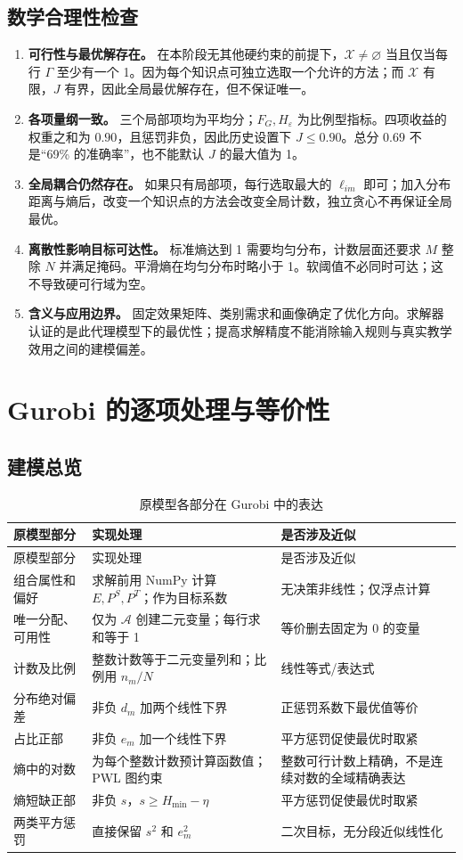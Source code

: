 \documentclass[UTF8,11pt,a4paper,fontset=fandol]{ctexart}
\newcommand{\A}{\mathcal A}
\newcommand{\X}{\mathcal X}
\begin{document}
\subsection{数学合理性检查}
\begin{enumerate}
\item \textbf{可行性与最优解存在。} 在本阶段无其他硬约束的前提下，$\X\ne\varnothing$ 当且仅当每行 $\Gamma$ 至少有一个 1。因为每个知识点可独立选取一个允许的方法；而 $\X$ 有限，$J$ 有界，因此全局最优解存在，但不保证唯一。
\item \textbf{各项量纲一致。} 三个局部项均为平均分；$F_G,H_\varepsilon$ 为比例型指标。四项收益的权重之和为 $0.90$，且惩罚非负，因此历史设置下 $J\le0.90$。总分 $0.69$ 不是“69\% 的准确率”，也不能默认 $J$ 的最大值为 1。
\item \textbf{全局耦合仍然存在。} 如果只有局部项，每行选取最大的 $\ell_{im}$ 即可；加入分布距离与熵后，改变一个知识点的方法会改变全局计数，独立贪心不再保证全局最优。
\item \textbf{离散性影响目标可达性。} 标准熵达到 1 需要均匀分布，计数层面还要求 $M$ 整除 $N$ 并满足掩码。平滑熵在均匀分布时略小于 1。软阈值不必同时可达；这不导致硬可行域为空。
\item \textbf{含义与应用边界。} 固定效果矩阵、类别需求和画像确定了优化方向。求解器认证的是此代理模型下的最优性；提高求解精度不能消除输入规则与真实教学效用之间的建模偏差。
\end{enumerate}

\section{Gurobi 的逐项处理与等价性}
\subsection{建模总览}
\small
\begin{longtable}{p{}p{}p{}}
\caption{原模型各部分在 Gurobi 中的表达}\label{tab:handling}\\
\toprule 原模型部分 & 实现处理 & 是否涉及近似 \\ \midrule\endfirsthead
\toprule 原模型部分 & 实现处理 & 是否涉及近似 \\ \midrule\endhead
\bottomrule\endfoot
组合属性和偏好 & 求解前用 NumPy 计算 $E,P^S,P^T$；作为目标系数 & 无决策非线性；仅浮点计算 \\
唯一分配、可用性 & 仅为 $\A$ 创建二元变量；每行求和等于 1 & 等价删去固定为 0 的变量 \\
计数及比例 & 整数计数等于二元变量列和；比例用 $n_m/N$ & 线性等式/表达式 \\
分布绝对偏差 & 非负 $d_m$ 加两个线性下界 & 正惩罚系数下最优值等价 \\
占比正部 & 非负 $e_m$ 加一个线性下界 & 平方惩罚促使最优时取紧 \\
熵中的对数 & 为每个整数计数预计算函数值；PWL 图约束 & 整数可行计数上精确，不是连续对数的全域精确表达 \\
熵短缺正部 & 非负 $s$，$s\ge H_{\min}-\eta$ & 平方惩罚促使最优时取紧 \\
两类平方惩罚 & 直接保留 $s^2$ 和 $e_m^2$ & 二次目标，无分段近似线性化 \\
\end{longtable}
\normalsize
\end{document}
